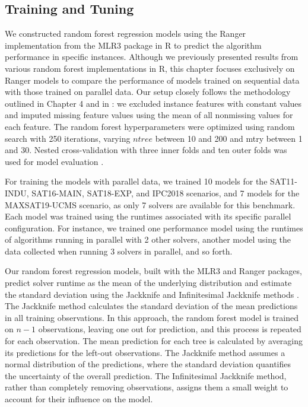 \subsection{Training and Tuning}
We constructed random forest regression models using the Ranger implementation from the MLR3 package \cite{ranger} in R to predict the algorithm performance in specific instances. Although we previously presented results from various random forest implementations in R, this chapter focuses exclusively on Ranger models to compare the performance of models trained on sequential data with those trained on parallel data. Our setup closely follows the methodology outlined in Chapter 4 and in \cite{BISCHL201641}: we excluded instance features with constant values and imputed missing feature values using the mean of all nonmissing values for each feature. The random forest hyperparameters were optimized using random search with 250 iterations, varying $ntree$ between 10 and 200 and mtry between 1 and 30. Nested cross-validation with three inner folds and ten outer folds was used for model evaluation \cite{BISCHL201641}.

For training the models with parallel data, we trained 10 models for the SAT11-INDU, SAT16-MAIN, SAT18-EXP, and IPC2018 scenarios, and 7 models for the MAXSAT19-UCMS scenario, as only 7 solvers are available for this benchmark. Each model was trained using the runtimes associated with its specific parallel configuration. For instance, we trained one performance model using the runtimes of algorithms running in parallel with 2 other solvers, another model using the data collected when running 3 solvers in parallel, and so forth.

Our random forest regression models, built with the MLR3 and Ranger packages, predict solver runtime as the mean of the underlying distribution and estimate the standard deviation using the Jackknife and Infinitesimal Jackknife methods \cite{wager2014confidence, mlr}. The Jackknife method calculates the standard deviation of the mean predictions in all training observations. In this approach, the random forest model is trained on $n-1$ observations, leaving one out for prediction, and this process is repeated for each observation. The mean prediction for each tree is calculated by averaging its predictions for the left-out observations. The Jackknife method assumes a normal distribution of the predictions, where the standard deviation quantifies the uncertainty of the overall prediction. The Infinitesimal Jackknife method, rather than completely removing observations, assigns them a small weight to account for their influence on the model. 

